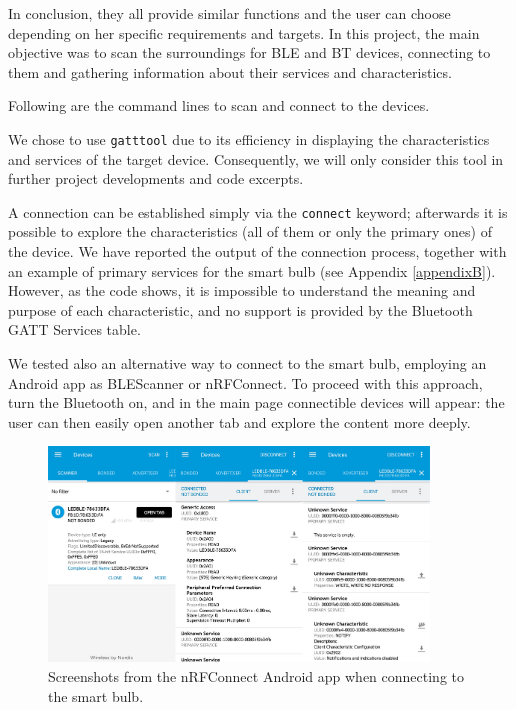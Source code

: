 In conclusion, they all provide similar functions and the user can choose depending on her specific requirements and targets. In this project, the main objective was to scan the surroundings for BLE and BT devices, connecting to them and gathering information about their services and characteristics.

Following are the command lines to scan and connect to the devices.




We chose to use \texttt{gatttool} due to its efficiency in displaying the characteristics and services of the target device. Consequently, we will only consider this tool in further project developments and code excerpts.

A connection can be established simply via the \texttt{connect} keyword; afterwards it is possible to explore the characteristics (all of them or only the primary ones) of the device. We have reported the output of the connection process, together with an example of primary services for the smart bulb (see Appendix \ref{appendixB}). However, as the code shows, it is impossible to understand the meaning and purpose of each characteristic, and no support is provided by the Bluetooth GATT Services table.

We tested also an alternative way to connect to the smart bulb, employing an Android app as BLEScanner or nRFConnect. To proceed with this approach, turn the Bluetooth on, and in the main page connectible devices will appear: the user can then easily open another tab and explore the content more deeply.

\begin{figure}
	\centering
	\includegraphics[width=0.9\textwidth]{nrfConnect.jpg}
	\caption{Screenshots from the nRFConnect Android app when connecting to the smart bulb.}
	\label{fig:nrfConnect}
\end{figure}	

